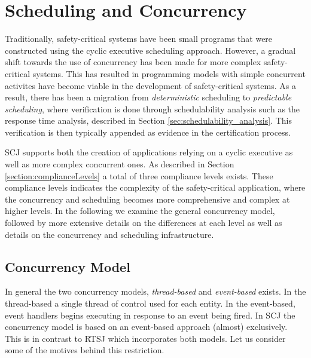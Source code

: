 \section{Scheduling and Concurrency}
\label{section:schedulingConcurrency}
Traditionally, safety-critical systems have been small programs that were constructed using the cyclic executive scheduling approach. However, a gradual shift towards the use of concurrency has been made for more complex safety-critical systems. This has resulted in programming models with simple concurrent activites have become viable in the development of safety-critical systems. As a result, there has been a migration from \textit{deterministic} scheduling to \textit{predictable scheduling}, where verification is done through schedulability analysis such as the response time analysis, described in Section \ref{sec:schedulability_analysis}. This verification is then typically appended as evidence in the certification process.

SCJ supports both the creation of applications relying on a cyclic executive as well as more complex concurrent ones. As described in Section \ref{section:complianceLevels} a total of three compliance levels exists. These compliance levels indicates the complexity of the safety-critical application, where the concurrency and scheduling becomes more comprehensive and complex at higher levels. In the following we examine the general concurrency model, followed by more extensive details on the differences at each level as well as details on the concurrency and scheduling infrastructure.


\subsection{Concurrency Model} %
\label{sub:concurrency_model}
In general the two concurrency models, \textit{thread-based} and \textit{event-based} exists. In the thread-based a single thread of control used for each entity. In the event-based, event handlers begins executing in response to an event being fired. In SCJ the concurrency model is based on an event-based approach (almost) exclusively. This is in contrast to RTSJ which incorporates both models. Let us consider some of the motives behind this restriction. 

